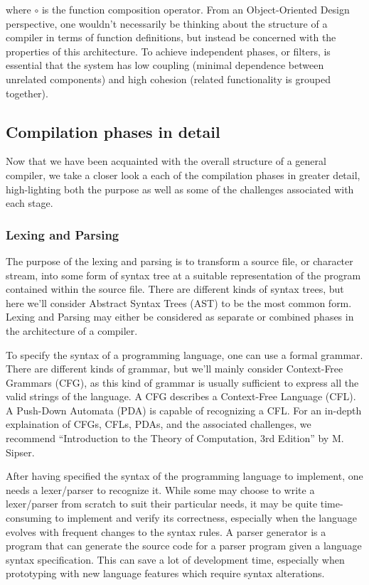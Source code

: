where $\circ$ is the function composition operator. From an Object-Oriented Design perspective, one wouldn't necessarily be thinking about the structure
of a compiler in terms of function definitions, but instead be concerned with the properties of this architecture. To achieve independent phases, or filters,
is essential that the system has low coupling (minimal dependence between unrelated components) and high cohesion (related functionality is grouped together).

\subsection{Compilation phases in detail}

Now that we have been acquainted with the overall structure of a general compiler, we take a closer look a each of the compilation phases in greater detail,
high-lighting both the purpose as well as some of the challenges associated with each stage.

\subsubsection{Lexing and Parsing}

The purpose of the lexing and parsing is to transform a source file, or character stream, into some form of syntax tree at a suitable representation of
the program contained within the source file. There are different kinds of syntax trees, but here we'll consider Abstract Syntax Trees (AST) to be the
most common form. Lexing and Parsing may either be considered as separate or combined phases in the architecture of a compiler.

To specify the syntax of a programming language, one can use a formal grammar. There are different kinds of grammar, but we'll mainly consider Context-Free
Grammars (CFG), as this kind of grammar is usually sufficient to express all the valid strings of the language. A CFG describes a Context-Free Language (CFL).
A Push-Down Automata (PDA) is capable of recognizing a CFL. For an in-depth explaination of CFGs, CFLs, PDAs, and the associated challenges, we
recommend ``Introduction to the Theory of Computation, 3rd Edition'' by M. Sipser\cite{sipser}.

After having specified the syntax of the programming language to implement, one needs a lexer/parser to recognize it. While some may choose to write a lexer/parser
from scratch to suit their particular needs, it may be quite time-consuming to implement and verify its correctness, especially when the language evolves with
frequent changes to the syntax rules. A parser generator is a program that can generate the source code for a parser program given a language syntax specification.
This can save a lot of development time, especially when prototyping with new language features which require syntax alterations.

